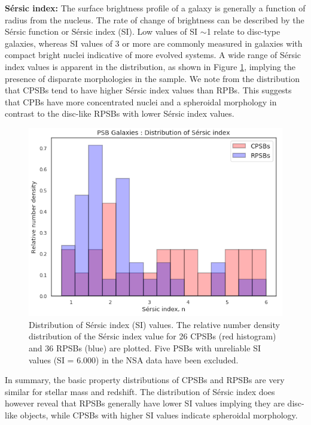 \textbf{S\'ersic index:} The surface brightness profile of a galaxy is generally a function of radius from the nucleus. The rate of change of brightness can be described by the S\'ersic function or S\'ersic index (SI). Low values of SI $\sim$1 relate to disc-type galaxies, whereas SI values of 3 or more are commonly measured in galaxies with compact bright nuclei indicative of more evolved systems. A wide range of S\'ersic index values is apparent in the distribution, as shown in Figure \ref{fig:Sersic-plot}, implying the presence of disparate morphologies in the sample. We note from the distribution that CPSBs tend to have higher S\'ersic index values than RPBs. This suggests that CPBs have more concentrated nuclei and a spheroidal morphology in contrast to the disc-like RPSBs with lower S\'ersic index values.

\begin{figure}
    \centering
    \includegraphics[width=\columnwidth]{images/JupyterPlots/Dist-Sersic-Index-All.png}
    \caption[Comparison of the distribution of S\'ersic index values of CPSBs and RPSBs]{Distribution of S\'ersic index (SI) values. The relative number density distribution of the S\'ersic index value for 26 CPSBs (red histogram) and 36 RPSBs (blue) are plotted. Five PSBs with unreliable SI values (SI = 6.000) in the NSA data  have been excluded.}
    \label{fig:Sersic-plot}
\end{figure}

In summary, the basic property distributions of CPSBs and RPSBs are very similar for stellar mass and redshift. The distribution of S\'ersic index does however reveal that RPSBs generally have lower SI values implying they are disc-like objects, while CPSBs with higher SI values indicate spheroidal morphology.

